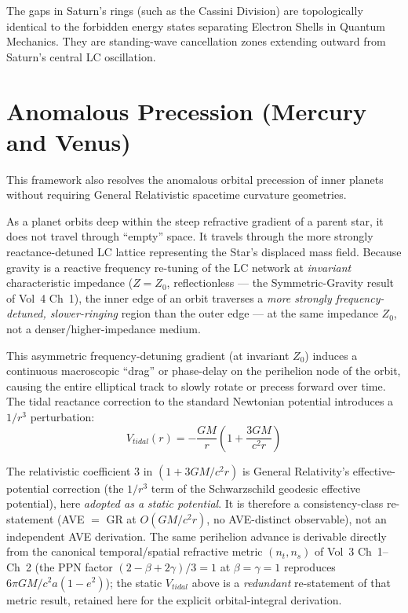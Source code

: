 The gaps in Saturn's rings (such as the Cassini Division) are topologically identical to the forbidden energy states separating Electron Shells in Quantum Mechanics. They are standing-wave cancellation zones extending outward from Saturn's central LC oscillation.

\section{Anomalous Precession (Mercury and Venus)}
This framework also resolves the anomalous orbital precession of inner planets without requiring General Relativistic spacetime curvature geometries. 

As a planet orbits deep within the steep refractive gradient of a parent star, it does not travel through ``empty'' space. It travels through the more strongly reactance-detuned LC lattice representing the Star's displaced mass field. Because gravity is a reactive frequency re-tuning of the LC network at \emph{invariant} characteristic impedance ($Z = Z_0$, reflectionless --- the Symmetric-Gravity result of Vol~4 Ch~1), the inner edge of an orbit traverses a \textit{more strongly frequency-detuned, slower-ringing} region than the outer edge --- at the same impedance $Z_0$, not a denser/higher-impedance medium.

This asymmetric frequency-detuning gradient (at invariant $Z_0$) induces a continuous macroscopic ``drag'' or phase-delay on the perihelion node of the orbit, causing the entire elliptical track to slowly rotate or precess forward over time. The tidal reactance correction to the standard Newtonian potential introduces a $1/r^3$ perturbation:
\begin{equation}
    V_{tidal}(r) = -\frac{GM}{r}\left(1 + \frac{3GM}{c^2 r}\right)
\end{equation}

\begin{warningbox}[Provenance of the ``3'' coefficient --- consistency-class, AVE $=$ GR]
The relativistic coefficient $3$ in $(1 + 3GM/c^2 r)$ is General Relativity's effective-potential correction (the $1/r^3$ term of the Schwarzschild geodesic effective potential), here \emph{adopted as a static potential}. It is therefore a consistency-class re-statement (AVE $=$ GR at $O(GM/c^2 r)$, no AVE-distinct observable), not an independent AVE derivation. The same perihelion advance is derivable directly from the canonical temporal/spatial refractive metric $(n_t, n_s)$ of Vol~3 Ch~1--Ch~2 (the PPN factor $(2-\beta+2\gamma)/3 = 1$ at $\beta = \gamma = 1$ reproduces $6\pi GM/c^2 a(1-e^2)$); the static $V_{tidal}$ above is a \emph{redundant} re-statement of that metric result, retained here for the explicit orbital-integral derivation.
\end{warningbox}

